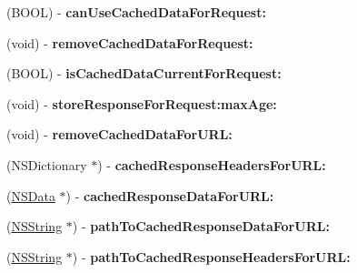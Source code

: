 \begin{DoxyCompactItemize}
\item 
\hypertarget{protocol_a_s_i_cache_delegate-p_a7cf0deb09983a6b552fd7a2130529c95}{
(\-B\-O\-O\-L) -\/ {\bfseries can\-Use\-Cached\-Data\-For\-Request\-:}}
\label{protocol_a_s_i_cache_delegate-p_a7cf0deb09983a6b552fd7a2130529c95}

\item 
\hypertarget{protocol_a_s_i_cache_delegate-p_a2e34141ed1db825ca2d1c292b068193e}{
(void) -\/ {\bfseries remove\-Cached\-Data\-For\-Request\-:}}
\label{protocol_a_s_i_cache_delegate-p_a2e34141ed1db825ca2d1c292b068193e}

\item 
\hypertarget{protocol_a_s_i_cache_delegate-p_a67c31b3473af7adba4cd548045935ac2}{
(\-B\-O\-O\-L) -\/ {\bfseries is\-Cached\-Data\-Current\-For\-Request\-:}}
\label{protocol_a_s_i_cache_delegate-p_a67c31b3473af7adba4cd548045935ac2}

\item 
\hypertarget{protocol_a_s_i_cache_delegate-p_ae7cfacf47d3d24e151530c033f993734}{
(void) -\/ {\bfseries store\-Response\-For\-Request\-:max\-Age\-:}}
\label{protocol_a_s_i_cache_delegate-p_ae7cfacf47d3d24e151530c033f993734}

\item 
\hypertarget{protocol_a_s_i_cache_delegate-p_aa2d162430d8c9bc47057030b3e305f18}{
(void) -\/ {\bfseries remove\-Cached\-Data\-For\-U\-R\-L\-:}}
\label{protocol_a_s_i_cache_delegate-p_aa2d162430d8c9bc47057030b3e305f18}

\item 
\hypertarget{protocol_a_s_i_cache_delegate-p_ab7b267fc153dcf624c91e2d07513f868}{
(\-N\-S\-Dictionary $\ast$) -\/ {\bfseries cached\-Response\-Headers\-For\-U\-R\-L\-:}}
\label{protocol_a_s_i_cache_delegate-p_ab7b267fc153dcf624c91e2d07513f868}

\item 
\hypertarget{protocol_a_s_i_cache_delegate-p_a24c0d2a6834e5a0332f3d95198fc681c}{
(\hyperlink{class_n_s_data}{\-N\-S\-Data} $\ast$) -\/ {\bfseries cached\-Response\-Data\-For\-U\-R\-L\-:}}
\label{protocol_a_s_i_cache_delegate-p_a24c0d2a6834e5a0332f3d95198fc681c}

\item 
\hypertarget{protocol_a_s_i_cache_delegate-p_a692463be3a5c9abe5a239eb761431799}{
(\hyperlink{class_n_s_string}{\-N\-S\-String} $\ast$) -\/ {\bfseries path\-To\-Cached\-Response\-Data\-For\-U\-R\-L\-:}}
\label{protocol_a_s_i_cache_delegate-p_a692463be3a5c9abe5a239eb761431799}

\item 
\hypertarget{protocol_a_s_i_cache_delegate-p_a0cab288cf23b1d6adb76981ed591d324}{
(\hyperlink{class_n_s_string}{\-N\-S\-String} $\ast$) -\/ {\bfseries path\-To\-Cached\-Response\-Headers\-For\-U\-R\-L\-:}}
\label{protocol_a_s_i_cache_delegate-p_a0cab288cf23b1d6adb76981ed591d324}


\end{DoxyCompactItemize}
